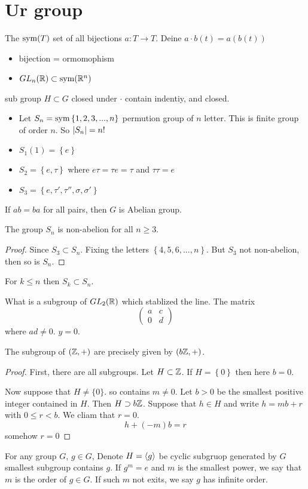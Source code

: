 \section{Ur group}
The $\operatorname{sym}(T)$ set of all bijections $a:T\to T$. Deine 
$a\cdot b(t)=a(b(t))$
\begin{itemize}
  \item  bijection = ormomophism
  \item  $GL_n(\mathbb{R})\subset \operatorname{sym}(\mathbb{R}^n)$
\end{itemize}
\begin{definition}
  sub group $H\subset G$ closed under $\cdot$ 
  contain indentiy, and closed.
\end{definition}
\begin{itemize}
  \item  Let $S_n=\operatorname{sym}\left\{1,2,3,...,n\right\}$ permution 
    group of $n$ letter. This is finite group of order
    $n$. So $\lvert S_n\rvert=n!$
  \item $S_1(1)=\left\{e\right\}$
  \item $S_2=\left\{e, \tau\right\}$ where 
    $e\tau=\tau e=\tau$ and $\tau\tau=e$
  \item $S_3=\left\{e, \tau', \tau'', \sigma,
    \sigma'\right\}$
\end{itemize}
\begin{definition}
  If $ab=ba$ for all pairs, then 
  $G$ is Abelian group.
\end{definition}
\begin{corollary}
  The group $S_n$ is non-abelion for all 
  $n\geq 3$.
\end{corollary}
\begin{proof}
  Since $S_3\subset S_n$. Fixing the letters
  $\left\{4,5,6,...,n\right\}$. But $S_3$ 
  not non-abelion, then so is $S_n$.
\end{proof}
\begin{claim}
  For $k\leq n$ then $S_k\subset S_n$.
\end{claim}
What is a subgroup of $GL_2(\mathbb{R})$ which 
stablized the line. The matrix
\[
  \begin{pmatrix}
    a&c\\
    0&d
  \end{pmatrix}
\]
where $ad\neq 0$.
$y=0$.

\begin{proposition}
  The subgroup of $(\mathbb{Z},+)$ are precisely 
  given by $(b\mathbb{Z},+)$. 
\end{proposition}
\begin{proof}
  First, there are all subgroups.
  Let $H\subset\mathbb{Z}$. If $H=\left\{0\right\}$ 
  then here $b=0$.

  Now suppose that $H\neq\{0\}$.  so contains $m\neq 0$.
  Let $b>0$ be the smallest positive 
  integer contained in $H$. Then $H\supset b\mathbb{Z}$.
  Suppose that $h\in H$ and write $h=mb+r$ with 
  $0\leq r<b$. We cliam that $r=0$. 
  \[h+(-m)b=r\]
  somehow $r=0$
\end{proof}

For any group $G$, $g\in G$, Denote $H=\left\langle g\right\rangle$
be cyclic subgruop generated by $G$
smallest subgroup contains $g$. If $g^m=e$ and 
$m$ is the smallest power, we say that $m$ is the order of
$g\in G$. If such $m$ not exits, we say
$g$ has infinite order.
















